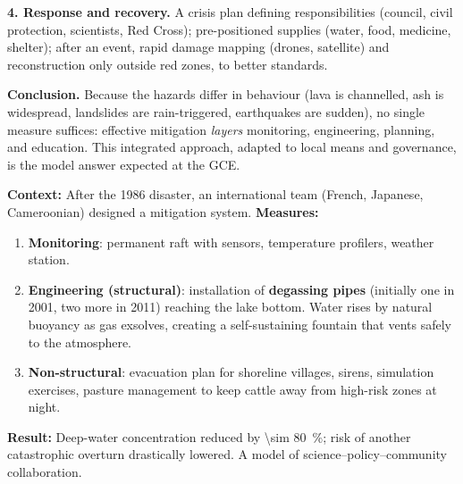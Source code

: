 \documentclass[11pt]{article}
\begin{document}
\begin{exoresolu}
\textbf{4. Response and recovery.} A crisis plan defining responsibilities (council, civil protection, scientists, Red Cross); pre-positioned supplies (water, food, medicine, shelter); after an event, rapid damage mapping (drones, satellite) and reconstruction only outside red zones, to better standards.

\textbf{Conclusion.} Because the hazards differ in behaviour (lava is channelled, ash is widespread, landslides are rain-triggered, earthquakes are sudden), no single measure suffices: effective mitigation \emph{layers} monitoring, engineering, planning, and education. This integrated approach, adapted to local means and governance, is the model answer expected at the GCE.
\end{exoresolu}

\begin{experience}
\textbf{Context:} After the 1986 disaster, an international team (French, Japanese, Cameroonian) designed a mitigation system.
\textbf{Measures:}
\begin{enumerate}
\item \textbf{Monitoring}: permanent raft with  sensors, temperature profilers, weather station.
\item \textbf{Engineering (structural)}: installation of \textbf{degassing pipes} (initially one in 2001, two more in 2011) reaching the lake bottom. Water rises by natural buoyancy as gas exsolves, creating a self-sustaining fountain that vents  safely to the atmosphere.
\item \textbf{Non-structural}: evacuation plan for shoreline villages, sirens, simulation exercises, pasture management to keep cattle away from high-risk zones at night.
\end{enumerate}
\textbf{Result:} Deep-water  concentration reduced by \SI{\sim 80}{\%}; risk of another catastrophic overturn drastically lowered. A model of science–policy–community collaboration.
\end{experience}
\end{document}
